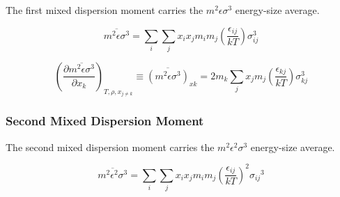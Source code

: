 \documentclass[12pt, letterpaper]{article}
\begin{document}
The first mixed dispersion moment carries the \(m^2\epsilon\sigma^3\) energy-size average.

\begin{equation}
    \overline{m^2 \epsilon \sigma^3}=\sum_{i} \sum_{j} x_{i} x_{j} m_{i} m_{j}\left(\frac{\epsilon_{i j}}{k T}\right) \sigma_{i j}^3
    \label{eq:m2epssigma3_bar}
\end{equation}


\begin{equation}
    \left(\frac{\partial\overline{m^{2}\epsilon\sigma^{3}}}{\partial x_{k}}\right)_{T,\rho,x_{j\neq k}}
    \equiv \overline{(m^{2}\epsilon\sigma^{3})}_{xk}
    =2m_{k}\sum_{j}x_{j}m_{j}\left(\frac{\epsilon_{kj}}{kT}\right)\sigma_{kj}^{3}
    \label{eq:m2epssigma3_xk}
\end{equation}

\subsubsection{Second Mixed Dispersion Moment}

The second mixed dispersion moment carries the \(m^2\epsilon^2\sigma^3\) energy-size average.

\begin{equation}
    \overline{m^2 \epsilon^2 \sigma^3}=\sum_{i} \sum_{j} x_{i} x_{j} m_{i} m_{j}\left(\frac{\epsilon_{i j}}{k T}\right)^2 \sigma_{i j}{ }^3
    \label{eq:m2eps2sigma3_bar}
\end{equation}

\end{document}
